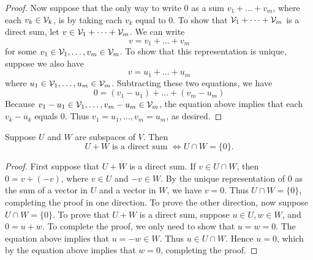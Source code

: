 \begin{definition}
\begin{proof}
	Now suppose that the only way to write 0 as a sum $v_1 + \dots + v_m$, where each
	$v_k \in \mathcal{V}_k$, is by taking each $v_k$ equal to 0. To show that $\mathcal{V}_1 + \dots + \mathcal{V}_m$ is a direct
	sum, let $v \in \mathcal{V}_1 + \dots + \mathcal{V}_m$. We can write
	\[v = v_1 + \dots + v_m\]
	for some $v_1 \in \mathcal{V}_1, \dots, v_m \in \mathcal{V}_m$. To show that this representation is unique,
	suppose we also have
	\[v = u_1 + \dots + u_m\]
	where $u_1 \in \mathcal{V}_1, \dots , u_m \in \mathcal{V}_m$. Subtracting these two equations, we have
	\[0 = (v_1 - u_1) + \dots + (v_m - u_m)\]
	Because $v_1 - u_1 \in \mathcal{V}_1, \dots , v_m - u_m \in \mathcal{V}_m$, the equation above implies that each
	$v_k - u_k$ equals 0. Thus $v_1 = u_1, \dots , v_m = u_m$, as desired.
\end{proof}
\begin{theorem}
	Suppose $U$ and $W$ are subspaces of $V$. Then
	$$U + W \text{ is a direct sum } \iff U \cap W = \{0\}.$$
\end{theorem}
\begin{proof}
	First suppose that $U + W$ is a direct sum. If $v \in U \cap W$, then $0 = v +(-v)$,
	where $v \in U$ and $-v \in W$. By the unique representation of 0 as the sum of a
	vector in $U$ and a vector in $W$, we have $v = 0$. Thus $U \cap W = \{0\}$, completing
	the proof in one direction.
	To prove the other direction, now suppose $U \cap W = \{0\}$. To prove that $U + W$
	is a direct sum, suppose $u \in U, w \in W$, and
	$0 = u + w$.
	To complete the proof, we only need to show that $u = w = 0$. The
	equation above implies that $u = -w \in W$. Thus $u \in U \cap W$. Hence $u = 0$,
	which by the equation above implies that $w = 0$, completing the proof.
\end{proof}
\end{definition}
